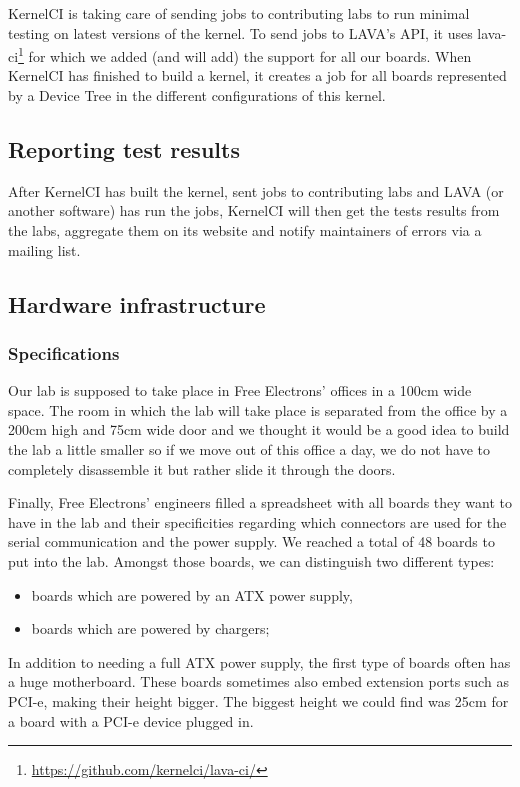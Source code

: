 KernelCI is taking care of sending jobs to contributing labs to run minimal testing on latest versions of the kernel. To send jobs to LAVA's API, it uses lava-ci\footnote{\url{https://github.com/kernelci/lava-ci/}} for which we added (and will add) the support for all our boards. When KernelCI has finished to build a kernel, it creates a job for all boards represented by a Device Tree in the different configurations of this kernel.

\subsection{Reporting test results}

After KernelCI has built the kernel, sent jobs to contributing labs and LAVA (or another software) has run the jobs, KernelCI will then get the tests results from the labs, aggregate them on its website and notify maintainers of errors via a mailing list.

\subsection{Hardware infrastructure}

\subsubsection{Specifications}

Our lab is supposed to take place in Free Electrons' offices in a 100cm wide space. The room in which the lab will take place is separated from the office by a 200cm high and 75cm wide door and we thought it would be a good idea to build the lab a little smaller so if we move out of this office a day, we do not have to completely disassemble it but rather slide it through the doors.

Finally, Free Electrons' engineers filled a spreadsheet with all boards they want to have in the lab and their specificities regarding which connectors are used for the serial communication and the power supply. We reached a total of 48 boards to put into the lab. Amongst those boards, we can distinguish two different types:
\begin{itemize}
  \item boards which are powered by an ATX power supply,
  \item boards which are powered by chargers;
\end{itemize}

In addition to needing a full ATX power supply, the first type of boards often has a huge motherboard. These boards sometimes also embed extension ports such as PCI-e, making their height bigger. The biggest height we could find was 25cm for a board with a PCI-e device plugged in.


